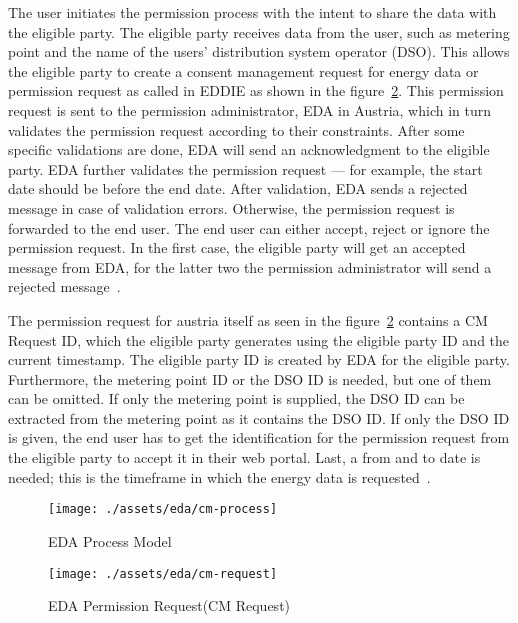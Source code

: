 The user initiates the permission process with the intent to share the data with the eligible party.
The eligible party receives data from the user, such as metering point and the name of the users' distribution system operator (DSO).
This allows the eligible party to create a consent management request for energy data or permission request as called in EDDIE as shown in the figure\ \ref{fig:eda-permission-request}.
This permission request is sent to the permission administrator, EDA in Austria, which in turn validates the permission request according to their constraints.
After some specific validations are done, EDA will send an acknowledgment to the eligible party.
EDA further validates the permission request — for example, the start date should be before the end date.
After validation, EDA sends a rejected message in case of validation errors.
Otherwise, the permission request is forwarded to the end user.
The end user can either accept, reject or ignore the permission request.
In the first case, the eligible party will get an accepted message from EDA, for the latter two the permission administrator will send a rejected message~\cite{eda, ebutilities}.

The permission request for austria itself as seen in the figure\ \ref{fig:eda-permission-request} contains a CM Request ID, which the eligible party generates using the eligible party ID and the current timestamp.
The eligible party ID is created by EDA for the eligible party.
Furthermore, the metering point ID or the DSO ID is needed, but one of them can be omitted.
If only the metering point is supplied, the DSO ID can be extracted from the metering point as it contains the DSO ID.
If only the DSO ID is given, the end user has to get the identification for the permission request from the eligible party to accept it in their web portal.
Last, a from and to date is needed; this is the timeframe in which the energy data is requested~\cite{ebutilities}.



\begin{figure}[h]
    \texttt{[image: ./assets/eda/cm-process]}
    \caption{EDA Process Model}
    \label{fig:eda-process-model}
\end{figure}

\begin{figure}[h]
    \texttt{[image: ./assets/eda/cm-request]}
    \caption{EDA Permission Request(CM Request)}
    \label{fig:eda-permission-request}
\end{figure}

